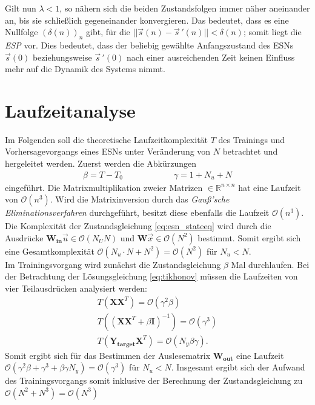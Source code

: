 \begin{appendices}
Gilt nun $\lambda < 1$, so nähern sich die beiden Zustandsfolgen immer näher aneinander an, bis sie schließlich gegeneinander konvergieren. Das bedeutet, dass es eine Nullfolge $(\delta(n))_n$ gibt, für die $||\vec{s}(n) - \vec{s}\,'(n)|| < \delta(n)$; somit liegt die \textit{ESP} vor. Dies bedeutet, dass der beliebig gewählte Anfangszustand des \textsc{ESN}s $\vec{s}(0)$ beziehungsweise $\vec{s}\,'(0)$ nach einer ausreichenden Zeit keinen Einfluss mehr auf die Dynamik des Systems nimmt.

\section{Laufzeitanalyse}
\label{sc:apx_runtime_complexity}
Im Folgenden soll die theoretische Laufzeitkomplexität $T$ des Trainings und Vorhersagevorgangs eines \textsc{ESN}s unter Veränderung von $N$ betrachtet und hergeleitet werden.
Zuerst werden die Abkürzungen
\begin{align*}
\beta = T-T_{0} \qquad\qquad\qquad \gamma = 1+N_u+N
\end{align*}
eingeführt. Die Matrixmultiplikation zweier Matrizen $\in \mathbb{R}^{n \times n}$ hat eine Laufzeit von $\mathcal{O}(n^3)$. Wird die Matrixinversion durch das \textit{Gauß'sche Eliminationsverfahren} durchgeführt, besitzt diese ebenfalls die Laufzeit $\mathcal{O}(n^3)$.\\
Die Komplexität der Zustandsgleichung \ref{eq:esn_stateeq} wird durch die Ausdrücke $\mathbf{W_{in}} \vec{u} \in \mathcal{O}(N_U N)$ und $\mathbf{W}\vec{x} \in \mathcal{O}(N^2)$ bestimmt. Somit ergibt sich eine Gesamtkomplexität $\mathcal{O}(N_u \cdot N + N^2) = \mathcal{O}(N^2)$ für $N_u < N$.\\

Im Trainingsvorgang wird zunächst die Zustandsgleichung $\beta$ Mal durchlaufen. Bei der Betrachtung der Lösungsgleichung \ref{eq:tikhonov} müssen die Laufzeiten von vier Teilausdrücken analysiert werden:
\begin{align*}
T\left(\mathbf{X}\mathbf{X}^T \right) = \mathcal{O}(\gamma^2 \beta) \\
T\left((\mathbf{X}\mathbf{X}^T+\beta \mathbf{I})^{-1} \right) = \mathcal{O}(\gamma^{3}) \\
T\left(\mathbf{Y_{target}}\mathbf{X}^T \right) = \mathcal{O}(N_y \beta \gamma).
\end{align*}
Somit ergibt sich für das Bestimmen der Auslesematrix $\mathbf{W_{out}}$ eine Laufzeit $\mathcal{O}(\gamma^2 \beta + \gamma^{3} + \beta \gamma N_y) = \mathcal{O}(\gamma^{3})$  für $N_u < N$.
Insgesamt ergibt sich der Aufwand des Trainingsvorgangs somit inklusive der Berechnung der Zustandsgleichung zu $\mathcal{O}(N^2 + N^{3}) = \mathcal{O}(N^{3})$\\


\end{appendices}
